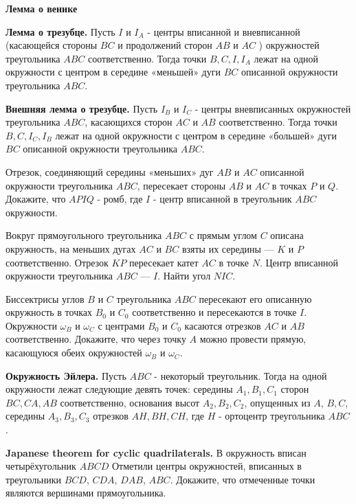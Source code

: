 \centerline{\bf \Huge Лемма о венике}

\begin{flushright}
        \scriptsize{}
\end{flushright}

\textbf{Лемма о трезубце.} Пусть $I$ и $I_A$ - центры вписанной и вневписанной (касающейся стороны $B C$ и продолжений сторон $A B$ и $A C$ ) окружностей треугольника $A B C$ соответственно. Тогда точки $B, C, I, I_A$ лежат на одной окружности с центром в середине «меньшей» дуги $B C$ описанной окружности треугольника $A B C$.


\textbf{Внешняя лемма о трезубце.} Пусть $I_B$ и $I_C$ - центры вневписанных окружностей треугольника $A B C$, касающихся сторон $A C$ и $A B$ соответственно. Тогда точки $B, C, I_C, I_B$ лежат на одной окружности с центром в середине «большей» дуги $B C$ описанной окружности треугольника $A B C$.


Отрезок, соединяющий середины «меньших» дуг $A B$ и $A C$ описанной окружности треугольника $A B C$, пересекает стороны $A B$ и $A C$ в точках $P$ и $Q$. Докажите, что $A P I Q$ - ромб, где $I$ - центр вписанной в треугольник $A B C$ окружности.


Вокруг прямоугольного треугольника $ABC$ с прямым углом $C$ описана окружность, на меньших дугах $AC$ и $BC$   взяты их середины --- $K$ и $P$  соответственно. Отрезок $KP$ пересекает катет $AC$ в точке $N$.   Центр вписанной окружности треугольника $ABC$  ---  $I$.   Найти угол $NIC$.


Биссектрисы углов $B$ и $C$ треугольника $A B C$ пересекают его описанную окружность в точках $B_0$ и $C_0$ соответственно и пересекаются в точке $I$. Окружности $\omega_B$ и $\omega_C$ с центрами $B_0$ и $C_0$ касаются отрезков $A C$ и $A B$ соответственно. Докажите, что через точку $A$ можно провести прямую, касающуюся обеих окружностей $\omega_B$ и $\omega_C$.


\textbf{Окружность Эйлера.} Пусть $A B C$ - некоторый треугольник. Тогда на одной окружности лежат следующие девять точек: середины $A_1, B_1, C_1$ сторон $B C, C A, A B$ соответственно, основания высот $A_2, B_2, C_2$, опущенных из $A$, $B, C$, середины $A_3, B_3, C_3$ отрезков $A H, B H, C H$, где $H$ - ортоцентр треугольника $A B C$.

\textbf{Japanese theorem for cyclic quadrilaterals.}
В окружность вписан четырёхугольник $ABCD$ Отметили центры окружностей, вписанных в треугольники $BCD$, $CDA$, $DAB$, $ABC$. Докажите, что отмеченные точки являются вершинами прямоугольника.